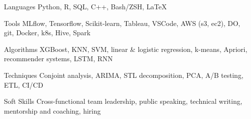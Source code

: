 

\begin{cvskills}

  \cvskill
    {Languages} %
    {Python, R, SQL, C++, Bash/ZSH, {\LaTeX{}}} %

  \cvskill
    {Tools} %
    {MLflow, Tensorflow, Scikit-learn, Tableau, VSCode, AWS (s3, ec2), DO, git, Docker, k8s, Hive, Spark} %

  \cvskill
    {Algorithms} %
    {XGBoost, KNN, SVM, linear \& logistic regression, k-means, Apriori, recommender systems, LSTM, RNN} %

  \cvskill
    {Techniques} %
    {Conjoint analysis, ARIMA, STL decomposition, PCA, A/B testing, ETL, CI/CD} %

  \cvskill
    {Soft Skills} %
    {Cross-functional team leadership, public speaking, technical writing, mentorship and coaching, hiring} %

\end{cvskills}
